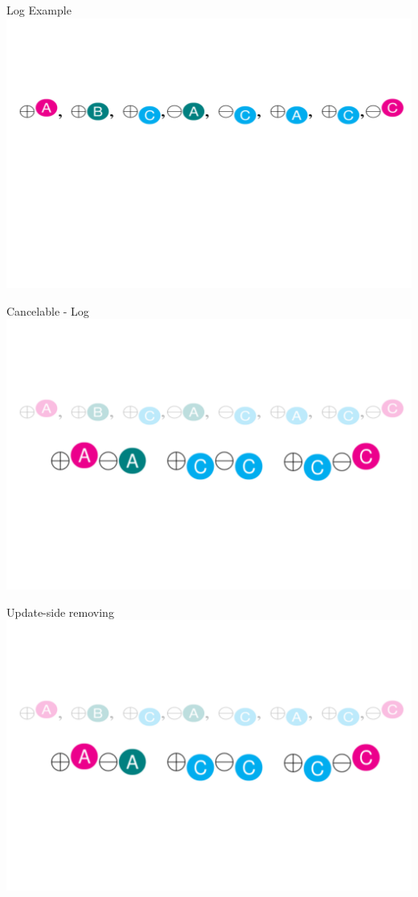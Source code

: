 \documentclass[english]{beamer} %
\begin{document}
\begin{frame}{Log Example}
\includegraphics[scale=0.5]{fig/example_1}
\end{frame}


\begin{frame}{Cancelable - Log}
\includegraphics[scale=0.5]{fig/example_us}
\end{frame}


\begin{frame}{Update-side removing}
\includegraphics[scale=0.5]{fig/example_us}
\end{frame}
\end{document}
